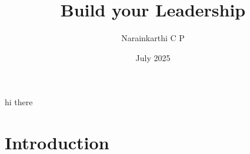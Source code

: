 \documentclass{article}
\title{Build your Leadership}
\author{Narainkarthi C P}
\date{July 2025}
\begin{document}
hi there
\maketitle

\section{Introduction}
\end{document}
